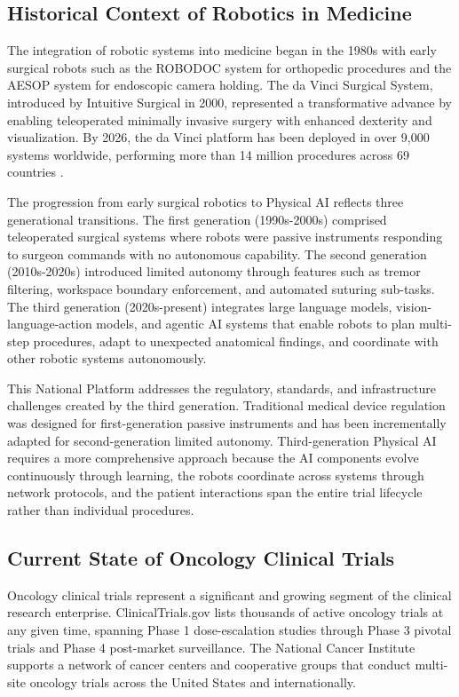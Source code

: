 \subsection{Historical Context of Robotics in Medicine}
\label{subsec:robotics-history}

The integration of robotic systems into medicine began in the 1980s with early
surgical robots such as the ROBODOC system for orthopedic procedures and the
AESOP system for endoscopic camera holding. The da Vinci Surgical System,
introduced by Intuitive Surgical in 2000, represented a transformative advance
by enabling teleoperated minimally invasive surgery with enhanced dexterity and
visualization. By 2026, the da Vinci platform has been deployed in over 9,000
systems worldwide, performing more than 14 million procedures across 69
countries \cite{usl-standard}.

The progression from early surgical robotics to Physical AI reflects three
generational transitions. The first generation (1990s-2000s) comprised
teleoperated surgical systems where robots were passive instruments responding
to surgeon commands with no autonomous capability. The second generation
(2010s-2020s) introduced limited autonomy through features such as tremor
filtering, workspace boundary enforcement, and automated suturing sub-tasks.
The third generation (2020s-present) integrates large language models, vision-
language-action models, and agentic AI systems that enable robots to plan
multi-step procedures, adapt to unexpected anatomical findings, and coordinate
with other robotic systems autonomously.

This National Platform addresses the regulatory, standards, and infrastructure
challenges created by the third generation. Traditional medical device
regulation was designed for first-generation passive instruments and has been
incrementally adapted for second-generation limited autonomy. Third-generation
Physical AI requires a more comprehensive approach because the AI components
evolve continuously through learning, the robots coordinate across systems
through network protocols, and the patient interactions span the entire trial
lifecycle rather than individual procedures.

\subsection{Current State of Oncology Clinical Trials}
\label{subsec:current-trials}

Oncology clinical trials represent a significant and growing segment of the
clinical research enterprise. ClinicalTrials.gov \cite{clinicaltrials-gov}
lists thousands of active oncology trials at any given time, spanning Phase 1
dose-escalation studies through Phase 3 pivotal trials and Phase 4 post-market
surveillance. The National Cancer Institute \cite{nci-clinical-trials} supports
a network of cancer centers and cooperative groups that conduct multi-site
oncology trials across the United States and internationally.

